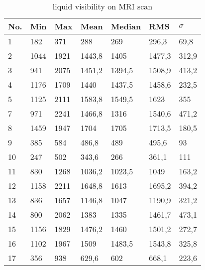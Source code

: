 \begin{table}[]
\centering
\begin{tabular}{@{}lllllll@{}}
\toprule
No. & Min  & Max  & Mean   & Median & RMS    & $\sigma$   \\ \midrule
1   & 182  & 371  & 288    & 269    & 296,3  & 69,8   \\
2   & 1044 & 1921 & 1443,8 & 1405   & 1477,3 & 312,9  \\
3   & 941  & 2075 & 1451,2 & 1394,5 & 1508,9 & 413,2  \\
4   & 1176 & 1709 & 1440   & 1437,5 & 1458,6 & 232,5  \\
5   & 1125 & 2111 & 1583,8 & 1549,5 & 1623   & 355    \\
7   & 971  & 2241 & 1466,8 & 1316   & 1540,6 & 471,2  \\
8   & 1459 & 1947 & 1704   & 1705   & 1713,5 & 180,5  \\
9   & 385  & 584  & 486,8  & 489    & 495,6  & 93     \\
10  & 247  & 502  & 343,6  & 266    & 361,1  & 111    \\
11  & 830  & 1268 & 1036,2 & 1023,5 & 1049   & 163,2  \\
12  & 1158 & 2211 & 1648,8 & 1613   & 1695,2 & 394,2  \\
13  & 836  & 1657 & 1146,8 & 1047   & 1190,9 & 321,2  \\
14  & 800  & 2062 & 1383   & 1335   & 1461,7 & 473,1  \\
15  & 1156 & 1829 & 1476,2 & 1460   & 1501,2 & 272,7  \\
16  & 1102 & 1967 & 1509   & 1483,5 & 1543,8 & 325,8  \\
17  & 356  & 938  & 629,6  & 602    & 668,1  & 223,6  \\ \bottomrule
\end{tabular}
\caption{liquid visibility on MRI scan}
\label{tab:visibility}
\end{table}

